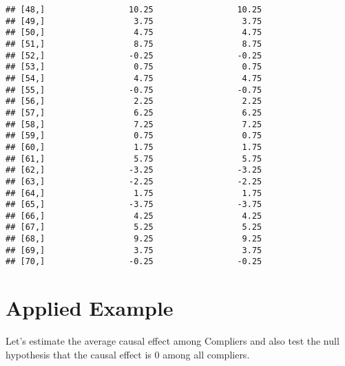 \documentclass[12pt,leqno]{article}
\theoremstyle{newstyle}
\begin{document}
\begin{verbatim}
## [48,]                 10.25                 10.25
## [49,]                  3.75                  3.75
## [50,]                  4.75                  4.75
## [51,]                  8.75                  8.75
## [52,]                 -0.25                 -0.25
## [53,]                  0.75                  0.75
## [54,]                  4.75                  4.75
## [55,]                 -0.75                 -0.75
## [56,]                  2.25                  2.25
## [57,]                  6.25                  6.25
## [58,]                  7.25                  7.25
## [59,]                  0.75                  0.75
## [60,]                  1.75                  1.75
## [61,]                  5.75                  5.75
## [62,]                 -3.25                 -3.25
## [63,]                 -2.25                 -2.25
## [64,]                  1.75                  1.75
## [65,]                 -3.75                 -3.75
## [66,]                  4.25                  4.25
## [67,]                  5.25                  5.25
## [68,]                  9.25                  9.25
## [69,]                  3.75                  3.75
## [70,]                 -0.25                 -0.25
\end{verbatim}

\hypertarget{applied-example}{%
\section{Applied Example}\label{applied-example}}

Let's estimate the average causal effect among Compliers and also test
the null hypothesis that the causal effect is \(0\) among all compliers.
\end{document}

